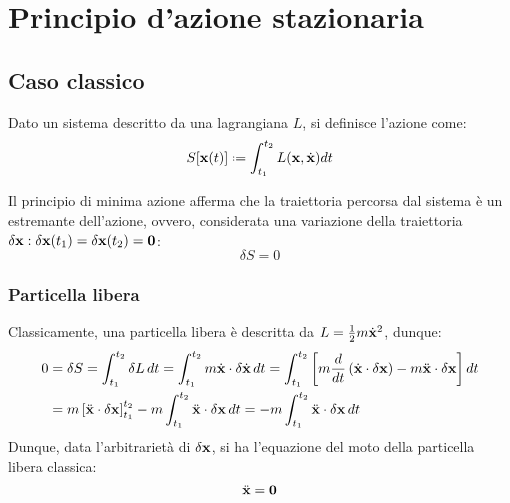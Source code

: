 
\section{Principio d'azione stazionaria}

\subsection{Caso classico}

\begin{definition}
	Dato un sistema descritto da una lagrangiana $ L $, si definisce l'azione come:
	\begin{equation}
		S[\ve{x}(t)] \defeq \int_{t_1}^{t_2} L(\ve{x}, \dot{\ve{x}}) dt
		\label{eq:5.1}
	\end{equation}
\end{definition}

Il principio di minima azione afferma che la traiettoria percorsa dal sistema è un estremante dell'azione, ovvero, considerata una variazione della traiettoria $ \delta\mathbf{x} : \delta\mathbf{x}(t_1) = \delta\mathbf{x}(t_2) = \mathbf{0} $:
\begin{equation}
	\delta S = 0
	\label{eq:5.2}
\end{equation}

\subsubsection{Particella libera}

Classicamente, una particella libera è descritta da $ L = \frac{1}{2} m \dot{\mathbf{x}}^2 $, dunque:
\begin{equation*}
	\begin{split}
		0
		&= \delta S = \int_{t_1}^{t_2} \delta L \,dt = \int_{t_1}^{t_2} m \dot{\mathbf{x}} \cdot \delta\dot{\mathbf{x}} \,dt = \int_{t_1}^{t_2} \left[ m \frac{d}{dt} \left( \dot{\mathbf{x}} \cdot \delta\mathbf{x} \right) - m \ddot{\mathbf{x}} \cdot \delta\mathbf{x} \right] dt\\
		&= m \left[ \ddot{\mathbf{x}} \cdot \delta\mathbf{x} \right]_{t_1}^{t_2} - m \int_{t_1}^{t_2} \ddot{\mathbf{x}} \cdot \delta\mathbf{x} \,dt = -m \int_{t_1}^{t_2} \ddot{\mathbf{x}} \cdot \delta\mathbf{x} \,dt
	\end{split}
\end{equation*}
Dunque, data l'arbitrarietà di $ \delta\mathbf{x} $, si ha l'equazione del moto della particella libera classica:
\begin{equation}
	\ddot{\mathbf{x}} = \mathbf{0}
	\label{eq:5.3}
\end{equation}

